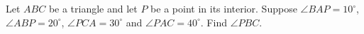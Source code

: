 Let $ABC$ be a triangle and let $P$ be a point in its interior. Suppose $\angle
BAP = 10^\circ$, $\angle ABP = 20^\circ$, $\angle PCA = 30^\circ$ and $\angle
PAC = 40^\circ$. Find $\angle PBC$.
